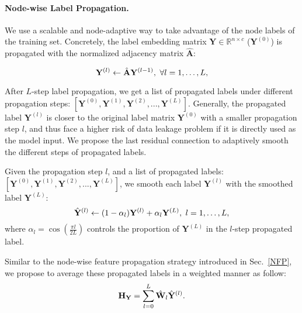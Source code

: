 \documentclass[sigconf]{acmart}
\begin{document}
\noindent\paragraph{\textbf{Node-wise Label Propagation.}} We use a scalable and node-adaptive way to take advantage of the node labels of the training set. 
Concretely, the label embedding matrix $\mathbf{Y} \in \mathbb{R}^{n \times c}$ ($\mathbf{Y}^{(0)}$) is propagated with the normalized adjacency matrix $\hat{\mathbf{A}}$:
\begin{small}
\begin{equation}
\small
    \mathbf{Y}^{(l)} \gets \hat{\mathbf{A}}\mathbf{Y}^{(l-1)},\ \forall  l=1,\ldots, L,
\end{equation}
\end{small}

After $L$-step label propagation, we get a list of propagated labels under different propagation steps: $[\mathbf{Y}^{(0)}, \mathbf{Y}^{(1)}, \mathbf{Y}^{(2)}, ..., \mathbf{Y}^{(L)}]$.
Generally, the propagated label $\mathbf{Y}^{(l)}$ is closer to the original label matrix $\mathbf{Y}^{(0)}$ with a smaller propagation step $l$, and thus face a higher risk of data leakage problem if it is directly used as the model input. We propose the last residual connection to adaptively smooth the different steps of propagated labels.
\begin{definition}
\label{df1}
Given the propagation step $l$, and a list of propagated labels: $[\mathbf{Y}^{(0)}, \mathbf{Y}^{(1)}, \mathbf{Y}^{(2)}, ..., \mathbf{Y}^{(L)}]$, we smooth each label $\mathbf{Y}^{(l)}$ with the smoothed label $\mathbf{Y}^{(L)}$:
\begin{equation}
\small
\label{iw}
\hat{\mathbf{Y}}^{(l)} \gets (1-\alpha_l)\mathbf{Y}^{(l)} + \alpha_l \mathbf{Y}^{(L)},\ l=1,\ldots, L,
\end{equation}
where $\alpha_l=\cos\left(\frac{\pi l}{2L}\right)$ controls the proportion of $\mathbf{Y}^{(L)}$ in the $l$-step propagated label.
\end{definition}

Similar to the node-wise feature propagation strategy  introduced in Sec.~\ref{NFP}, we propose to average these propagated labels in a weighted manner as follow:
\begin{equation}
\small
      \mathbf{H}_{\mathbf{Y}}=\sum_{l=0}^L \hat{\mathbf{W}}_l \hat{\mathbf{Y}}^{(l)}.
      \label{HY}
\end{equation}
\end{document}
